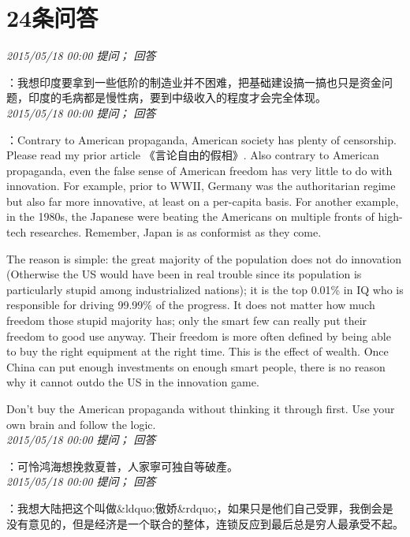 \documentclass[twocolumn]{ctexart}
\begin{document}
\section{24条问答}

\textit{\hfill\noindent\small 2015/05/18 00:00 提问； 回答}

：我想印度要拿到一些低阶的制造业并不困难，把基础建设搞一搞也只是资金问题，印度的毛病都是慢性病，要到中级收入的程度才会完全体现。\\

\textit{\hfill\noindent\small 2015/05/18 00:00 提问； 回答}

：Contrary to American propaganda, American society has plenty of censorship. Please read my prior article 《言论自由的假相》. Also contrary to American propaganda, even the false sense of American freedom has very little to do with innovation. For example, prior to WWII, Germany was the authoritarian regime but also far more innovative, at least on a per-capita basis. For another example, in the 1980s, the Japanese were beating the Americans on multiple fronts of high-tech researches. Remember, Japan is as conformist as they come.

The reason is simple: the great majority of the population does not do innovation (Otherwise the US would have been in real trouble since its population is particularly stupid among industrialized nations); it is the top 0.01\% in IQ who is responsible for driving 99.99\% of the progress. It does not matter how much freedom those stupid majority has; only the smart few can really put their freedom to good use anyway. Their freedom is more often defined by being able to buy the right equipment at the right time. This is the effect of wealth. Once China can put enough investments on enough smart people, there is no reason why it cannot outdo the US in the innovation game.

Don't buy the American propaganda without thinking it through first. Use your own brain and follow the logic.\\

\textit{\hfill\noindent\small 2015/05/18 00:00 提问； 回答}

：可怜鸿海想挽救夏普，人家寧可独自等破產。\\

\textit{\hfill\noindent\small 2015/05/18 00:00 提问； 回答}

：我想大陆把这个叫做\&ldquo;傲娇\&rdquo;，如果只是他们自己受罪，我倒会是没有意见的，但是经济是一个联合的整体，连锁反应到最后总是穷人最承受不起。\\
\end{document}
